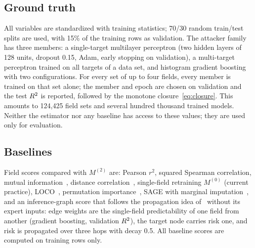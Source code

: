 \begin{table}[!tbp]
\centering\small
\caption{Data sets. $n$: train/test rows; $p$: candidate fields; sets: field sets with exact
three-attacker ground truth.}\label{tab:data}
\end{table}

\subsection{Ground truth}
All variables are standardized with training statistics; 70/30 random train/test splits are
used, with 15\% of the training rows as validation. The attacker family has three members: a
single-target multilayer perceptron (two hidden layers of 128 units, dropout 0.15, Adam,
early stopping on validation), a multi-target perceptron trained on all targets of a data set,
and histogram gradient boosting with two configurations. For every set of up to four fields,
every member is trained on that set alone; the member and epoch are chosen on validation and the
test $R^{2}$ is reported, followed by the monotone closure~\eqref{eq:closure}. This amounts to
124,425 field sets and several hundred thousand trained models. Neither the
estimator nor any baseline has access to these values; they are used only for evaluation.

\subsection{Baselines}
Field scores compared with $M^{(2)}$ are: Pearson $r^2$, squared Spearman correlation, mutual
information~\cite{kraskov2004mi}, distance correlation~\cite{szekely2007dcor}, single-field
retraining $M^{(0)}$ (current practice), LOCO~\cite{lei2018loco}, permutation
importance~\cite{breiman2001rf}, SAGE with marginal imputation~\cite{covert2020sage}, and an
inference-graph score that follows the propagation idea of~\cite{hu2026ignn} without its expert
inputs: edge weights are the single-field predictability of one field from another (gradient
boosting, validation $R^{2}$), the target node carries risk one, and risk is propagated over three
hops with decay 0.5. All baseline scores are computed on training rows only.

